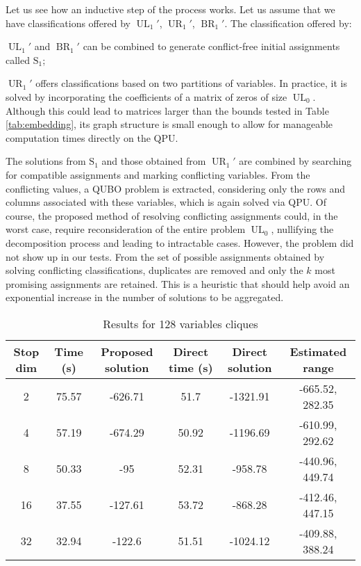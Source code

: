 \documentclass{ceurart}
\begin{document}
Let us see how an inductive step of the process works. Let us assume that we have classifications offered by $\operatorname{UL}_1'$, $\operatorname{UR}_1'$, $\operatorname{BR}_1'$. The classification offered by:
\begin{enumerate*}[label=\arabic*)]
    \item $\operatorname{UL}_1'$ and $\operatorname{BR}_1'$ can be combined to generate conflict-free initial assignments called $\operatorname{S_1}$;
    \item $\operatorname{UR}_1'$ offers classifications based on two partitions of variables. In practice, it is solved by incorporating the coefficients of a matrix of zeros of size $\operatorname{UL}_0$. Although this could lead to matrices larger than the bounds tested in Table \ref{tab:embedding}, its graph structure is small enough to allow for manageable computation times directly on the QPU.
\end{enumerate*}
The solutions from $\operatorname{S_1}$ and those obtained from $\operatorname{UR}_1'$ are combined by searching for compatible assignments and marking conflicting variables. From the conflicting values, a QUBO problem is extracted, considering only the rows and columns associated with these variables, which is again solved via QPU. Of course, the proposed method of resolving conflicting assignments could, in the worst case, require reconsideration of the entire problem \(\operatorname{UL}_0\), nullifying the decomposition process and leading to intractable cases. However, the problem did not show up in our tests. From the set of possible assignments obtained by solving conflicting classifications, duplicates are removed and only the $k$ most promising assignments are retained. This is a heuristic that should help avoid an exponential increase in the number of solutions to be aggregated.

\begin{table}
    \centering
    \begin{tabular}{cccccc}
        \toprule
        Stop dim & Time (s) & Proposed solution & Direct time (s) & Direct solution & Estimated range \\
        \midrule
        2 & 75.57 & -626.71 & 51.7 & -1321.91 & -665.52, 282.35 \\
        4 & 57.19 & -674.29 & 50.92 & -1196.69 & -610.99, 292.62 \\
        8 & 50.33 & -95 & 52.31 & -958.78 & -440.96, 449.74 \\
        16 & 37.55 & -127.61 & 53.72 & -868.28 & -412.46, 447.15 \\
        32 & 32.94 & -122.6 & 51.51 & -1024.12 & -409.88, 388.24 \\
        \bottomrule
    \end{tabular}
    \caption{Results for 128 variables cliques}
    \label{tab:qsplit}
\end{table}
\end{document}
